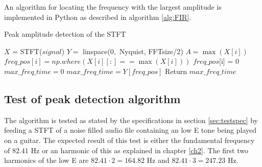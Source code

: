 An algorithm for locating the frequency with the largest amplitude is implemented in Python as described in algorithm \ref{alg:FIR}.
\begin{algorithm}[H]
\caption{Peak amplitude detection of the STFT}
\label{alg:FIR}
\begin{algorithmic}[1]
\State  $X$ = STFT($signal$) 
\State $Y =$ linspace($0,$ Nyquist, FFTsize/2) 
		\State $A = \max(X[i])$ 
		 
			\State $freq\_pos[i] = np.where(X[i][:] == \max(X[i]))$ 
		\Else
			\State $freq\_pos$[i] = 0	
		\EndIf
			\State $max\_freq\_time = 0$
		\Else
			\State $max\_freq\_time = Y[freq\_pos]$
		\EndIf
	\EndFor
	\State Return $max\_freq\_time$
\EndProcedure
\end{algorithmic}
\end{algorithm}

\subsection{Test of peak detection algorithm}
The algorithm is tested as stated by the specifications in section \ref{sec:testspec} by feeding a STFT of a noise filled audio file containing an low E tone being played on a guitar.
The expected result of this test is either the fundamental frequency of $82.41$ Hz or an harmonic of this as explained in chapter \ref{ch2}. The first two harmonics of the low E are $82.41 \cdot 2 = 164.82$ Hz and $82.41 \cdot 3 = 247.23$ Hz.

